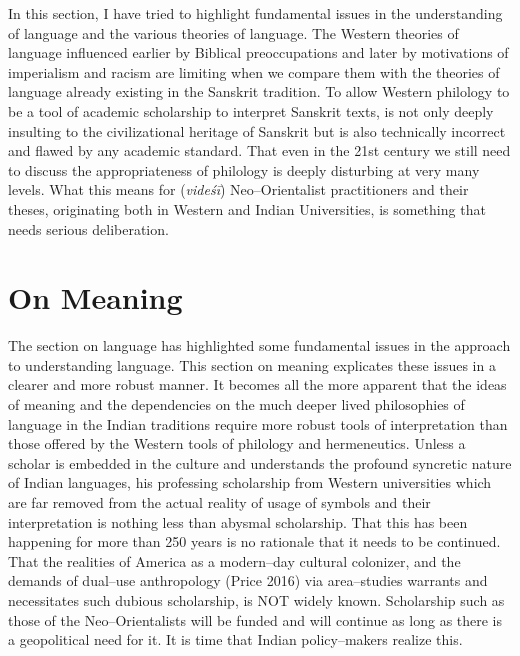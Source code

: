 In this section, I have tried to highlight fundamental issues in the understanding of language and the various theories of language. The Western theories of language influenced earlier by Biblical preoccupations and later by motivations of imperialism and racism are limiting when we compare them with the theories of language already existing in the Sanskrit tradition. To allow Western philology to be a tool of academic scholarship to interpret Sanskrit texts, is not only deeply insulting to the civilizational heritage of Sanskrit but is also technically incorrect and flawed by any academic standard. That even in the 21st century we still need to discuss the appropriateness of philology is deeply disturbing at very many levels. What this means for (\textit{videśī}) Neo–Orientalist practitioners and their theses, originating both in Western and Indian Universities, is something that needs serious deliberation.

\newpage


\section*{On Meaning}

The section on language has highlighted some fundamental issues in the approach to understanding language. This section on meaning explicates these issues in a clearer and more robust manner. It becomes all the more apparent that the ideas of meaning and the dependencies on the much deeper lived philosophies of language in the Indian traditions require more robust tools of interpretation than those offered by the Western tools of philology and hermeneutics. Unless a scholar is embedded in the culture and understands the profound syncretic nature of Indian languages, his professing scholarship from Western universities which are far removed from the actual reality of usage of symbols and their interpretation is nothing less than abysmal scholarship. That this has been happening for more than 250 years is no rationale that it needs to be continued. That the realities of America as a modern–day cultural colonizer, and the demands of dual–use anthropology (Price 2016) via area–studies warrants and necessitates such dubious scholarship, is NOT widely known. Scholarship such as those of the Neo–Orientalists will be funded and will continue as long as there is a geopolitical need for it. It is time that Indian policy–makers realize this.


